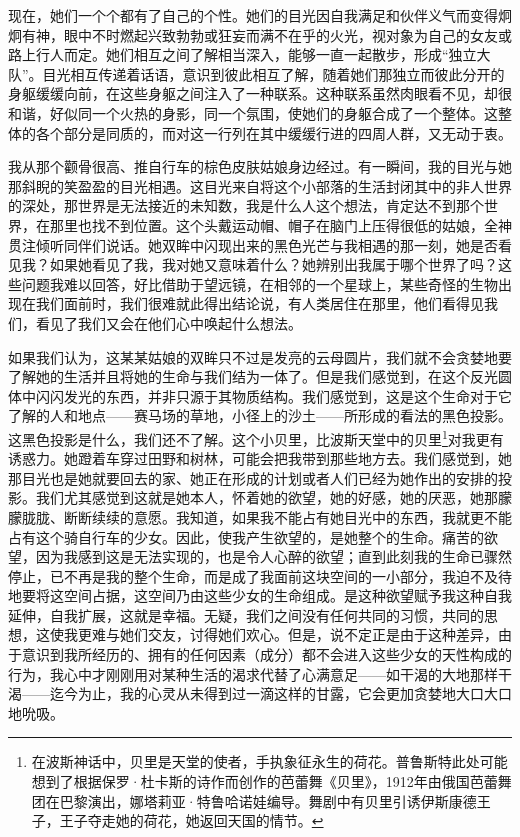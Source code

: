 \par 现在，她们一个个都有了自己的个性。她们的目光因自我满足和伙伴义气而变得炯炯有神，眼中不时燃起兴致勃勃或狂妄而满不在乎的火光，视对象为自己的女友或路上行人而定。她们相互之间了解相当深入，能够一直一起散步，形成“独立大队”。目光相互传递着话语，意识到彼此相互了解，随着她们那独立而彼此分开的身躯缓缓向前，在这些身躯之间注入了一种联系。这种联系虽然肉眼看不见，却很和谐，好似同一个火热的身影，同一个氛围，使她们的身躯合成了一个整体。这整体的各个部分是同质的，而对这一行列在其中缓缓行进的四周人群，又无动于衷。
\par 我从那个颧骨很高、推自行车的棕色皮肤姑娘身边经过。有一瞬间，我的目光与她那斜睨的笑盈盈的目光相遇。这目光来自将这个小部落的生活封闭其中的非人世界的深处，那世界是无法接近的未知数，我是什么人这个想法，肯定达不到那个世界，在那里也找不到位置。这个头戴运动帽、帽子在脑门上压得很低的姑娘，全神贯注倾听同伴们说话。她双眸中闪现出来的黑色光芒与我相遇的那一刻，她是否看见我？如果她看见了我，我对她又意味着什么？她辨别出我属于哪个世界了吗？这些问题我难以回答，好比借助于望远镜，在相邻的一个星球上，某些奇怪的生物出现在我们面前时，我们很难就此得出结论说，有人类居住在那里，他们看得见我们，看见了我们又会在他们心中唤起什么想法。
\par 如果我们认为，这某某姑娘的双眸只不过是发亮的云母圆片，我们就不会贪婪地要了解她的生活并且将她的生命与我们结为一体了。但是我们感觉到，在这个反光圆体中闪闪发光的东西，并非只源于其物质结构。我们感觉到，这是这个生命对于它了解的人和地点——赛马场的草地，小径上的沙土——所形成的看法的黑色投影。这黑色投影是什么，我们还不了解。这个小贝里，比波斯天堂中的贝里\footnote{在波斯神话中，贝里是天堂的使者，手执象征永生的荷花。普鲁斯特此处可能想到了根据保罗·杜卡斯的诗作而创作的芭蕾舞《贝里》，1912年由俄国芭蕾舞团在巴黎演出，娜塔莉亚·特鲁哈诺娃编导。舞剧中有贝里引诱伊斯康德王子，王子夺走她的荷花，她返回天国的情节。}对我更有诱惑力。她蹬着车穿过田野和树林，可能会把我带到那些地方去。我们感觉到，她那目光也是她就要回去的家、她正在形成的计划或者人们已经为她作出的安排的投影。我们尤其感觉到这就是她本人，怀着她的欲望，她的好感，她的厌恶，她那朦朦胧胧、断断续续的意愿。我知道，如果我不能占有她目光中的东西，我就更不能占有这个骑自行车的少女。因此，使我产生欲望的，是她整个的生命。痛苦的欲望，因为我感到这是无法实现的，也是令人心醉的欲望；直到此刻我的生命已骤然停止，已不再是我的整个生命，而是成了我面前这块空间的一小部分，我迫不及待地要将这空间占据，这空间乃由这些少女的生命组成。是这种欲望赋予我这种自我延伸，自我扩展，这就是幸福。无疑，我们之间没有任何共同的习惯，共同的思想，这使我更难与她们交友，讨得她们欢心。但是，说不定正是由于这种差异，由于意识到我所经历的、拥有的任何因素（成分）都不会进入这些少女的天性构成的行为，我心中才刚刚用对某种生活的渴求代替了心满意足——如干渴的大地那样干渴——迄今为止，我的心灵从未得到过一滴这样的甘露，它会更加贪婪地大口大口地吮吸。

